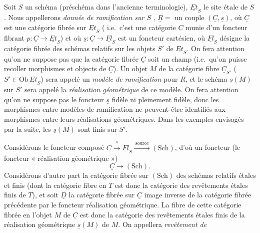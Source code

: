 \documentclass[11pt,a4paper]{article}
\begin{document}
Soit $S$ un schéma (préschéma dans l'ancienne terminologie), $\underline{Et}_S$
le site étale de $S$. Nous appellerons \emph{donnée de ramification sur $S$}
, $\underline{R} = $ un couple $(\underline{C},
\underline{s})$, où $\underline{C}$ est une catégorie fibrée sur
$\underline{Et}_S$ ( i.e.\ c'est une catégorie
$\underline{C}$ munie d'un foncteur fibrant $p : \underline{C} \to
\underline{Et}_S$) et où $\underline{s} : \underline{C} \to \underline{Fl}_S$
est un foncteur cartésien, où $\underline{Fl}_S$ désigne la catégorie fibrée
des  schémas relatifs sur les objets $S'$ de
$\underline{Et}_S$. On fera attention qu'on ne suppose pas que la catégorie
fibrée $\underline{C}$ soit un champ (i.e.\ qu'on puisse recoller morphismes et
objects de $\underline{C}$). Un objet $M$ de la catégorie fibre
$\underline{C}_{S'}$ ($S' \in \mathrm{Ob}\,\underline{Et}_S$) sera appelé un
\emph{modèle de ramification} pour $\underline{R}$, et le schéma
$\underline{s}(M)$ sur $S'$ sera appelé la \emph{réalisation géométrique} de ce
modèle. On fera attention qu'on ne suppose pas le foncteur $\underline{s}$
fidèle ni pleinement fidèle, donc les morphismes entre modèles de ramification
ne peuvent être identifiés aux morphismes entre leurs réalisations
géométriques. Dans les exemples envisagés par la suite, les $\underline{s}(M)$
sont finis sur $S'$.

Considérons le foncteur composé $\underline{C} \xrightarrow{\ \underline{s}\ }
\underline{Fl}_S \xrightarrow{\ \text{source}\ } (\mathrm{Sch})$, d'où un
foncteur (le foncteur « réalisation géométrique »)
\[
  \underline{C} \longrightarrow (\mathrm{Sch}) .
\]
Considérons d'autre part la catégorie fibrée sur $(\mathrm{Sch})$ des schémas
relatifs étales et finis (dont la catégorie fibre en $T$ est donc la catégorie
des revêtements étales finis de $T$), et soit $\underline{D}$ la catégorie
fibrée sur $\underline{C}$ image inverse de la catégorie fibrée précédente par
le foncteur réalisation géométrique. La fibre de cette catégorie fibrée en
l'objet $M$ de $\underline{C}$ est donc la catégorie des revêtements étales
finis de la réalisation géométrique $\underline{s}(M)$ de $M$. On appellera
\emph{revêtement de}
\end{document}
